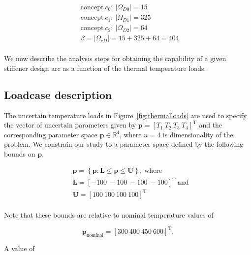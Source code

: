 \begin{equation*}
	\begin{aligned}
		& \mathrm{concept~}c_0:~|\Omega_{D0}| = 15\\
		& \mathrm{concept~}c_1:~|\Omega_{D1}| = 325\\
		& \mathrm{concept~}c_2:~|\Omega_{D2}| = 64\\
		& \beta = |\Omega_{cD}| = 15 + 325 + 64 = 404.\\
	\end{aligned}
\end{equation*}

We now describe the analysis steps for obtaining the capability of a given stiffener design arc as a function of the thermal temperature loads.

\subsection{Loadcase description} \label{subsec:loadcase}

The uncertain temperature loads in Figure~\ref{fig:thermalloads} are used to specify the vector of uncertain parameters given by $\mathbf{p} = \left[T_1 ~ T_2 ~ T_3 ~ T_4\right]^{\mathrm{T}}$ and the corresponding parameter space $\mathbf{p}\in\mathbb{R}^4$, where $n = 4$ is dimensionality of the problem. We constrain our study to a parameter space defined by the following bounds on $\mathbf{p}$.

\begin{equation*}
	\begin{aligned}
		& \mathbf{p} = \left\{\mathbf{p}: \mathbf{L} \le \mathbf{p} \le \mathbf{U}\right\},~\textrm{where}\\
		& \mathbf{L} = \left[-100 ~ -100 ~ -100 ~ -100\right]^{\mathrm{T}}~\textrm{and}\\
		& \mathbf{U} = \left[100 ~ 100 ~ 100 ~ 100\right]^{\mathrm{T}}\\
	\end{aligned}
\end{equation*}

Note that these bounds are relative to nominal temperature values of 

\begin{equation*}
	\mathbf{p}_{\textrm{nominal}} = \left[300 ~ 400 ~ 450 ~ 600\right]^{\mathrm{T}}.
\end{equation*}

A value of 

